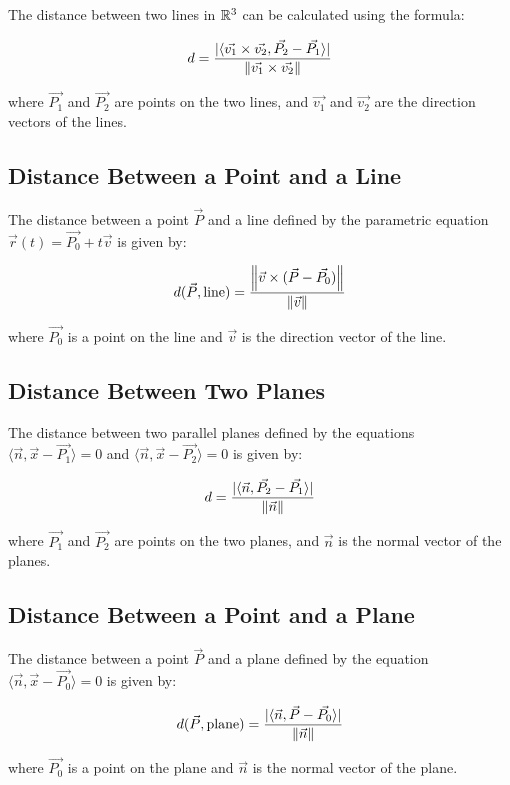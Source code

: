 The distance between two lines in \(\mathbb{R}^3\) can be calculated using the formula:

\[
	d = \frac{|\langle \vec{v_1} \times \vec{v_2}, \vec{P_2} - \vec{P_1} \rangle|}{\left\| \vec{v_1} \times \vec{v_2} \right\|}
\]

where \(\vec{P_1}\) and \(\vec{P_2}\) are points on the two lines, and \(\vec{v_1}\) and \(\vec{v_2}\) are the direction vectors of the lines.

\subsection{Distance Between a Point and a Line}

The distance between a point \(\vec{P}\) and a line defined by the parametric equation \(\vec{r}(t) = \vec{P_0} + t\vec{v}\) is given by:

\[
	d(\vec{P}, \text{line}) = \frac{\left\| \vec{v} \times (\vec{P} - \vec{P_0}) \right\|}{\left\| \vec{v} \right\|}
\]

where \(\vec{P_0}\) is a point on the line and \(\vec{v}\) is the direction vector of the line.

\subsection{Distance Between Two Planes}

The distance between two parallel planes defined by the equations \(\langle \vec{n}, \vec{x} - \vec{P_1} \rangle = 0\) and 
\(\langle \vec{n}, \vec{x} - \vec{P_2} \rangle = 0\) is given by:

\[
	d = \frac{|\langle \vec{n}, \vec{P_2} - \vec{P_1} \rangle|}{\left\| \vec{n} \right\|}
\]

where \(\vec{P_1}\) and \(\vec{P_2}\) are points on the two planes, and \(\vec{n}\) is the normal vector of the planes.

\subsection{Distance Between a Point and a Plane}

The distance between a point \(\vec{P}\) and a plane defined by the equation \(\langle \vec{n}, \vec{x} - \vec{P_0} \rangle = 0\) is given by:

\[
	d(\vec{P}, \text{plane}) = \frac{|\langle \vec{n}, \vec{P} - \vec{P_0} \rangle|}{\left\| \vec{n} \right\|}
\]

where \(\vec{P_0}\) is a point on the plane and \(\vec{n}\) is the normal vector of the plane.


